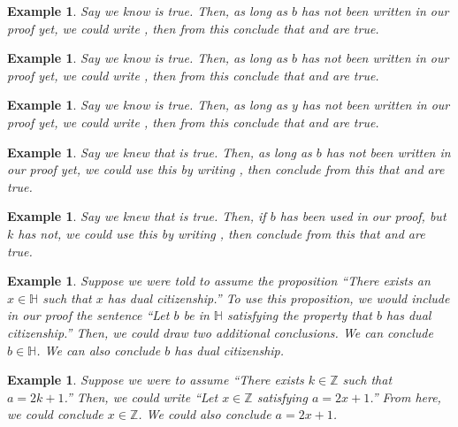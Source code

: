 \documentclass{book}
\newcounter{ekcounter}%
\theoremstyle{ekimcustom}
\newtheorem{example}[ekcounter]{Example}
\begin{document}
\begin{example}
Say we know  is true. Then, as long as $b$ has not been written in our proof yet, we could write , then from this conclude that  and  are true.
\end{example}
\begin{example}
Say we know  is true. Then, as long as $b$ has not been written in our proof yet, we could write , then from this conclude that  and  are true.
\end{example}
\begin{example}
Say we know  is true. Then, as long as $y$ has not been written in our proof yet, we could write , then from this conclude that  and  are true.
\end{example}
\begin{example}
Say we knew that  is true. Then, as long as $b$ has not been written in our proof yet, we could use this by writing , then conclude from this that  and  are true.
\end{example}
\begin{example}
Say we knew that  is true. Then, if $b$ has been used in our proof, but $k$ has not, we could use this by writing , then conclude from this that  and  are true.
\end{example}

\begin{example}
Suppose we were told to assume the proposition ``There exists an $x \in \mathbb{H}$ such that $x$ has dual citizenship.'' To use this proposition, we would include in our proof the sentence ``Let $b$ be in $\mathbb{H}$ satisfying the property that $b$ has dual citizenship.'' Then, we could draw two additional conclusions. We can conclude $b \in \mathbb{H}$. We can also conclude $b$ has dual citizenship.
\end{example}
\begin{example}\label{example:use-existence-revisit-first-proof}
Suppose we were to assume ``There exists $k \in \mathbb{Z}$ such that $a=2k+1$.'' Then, we could write ``Let $x \in \mathbb{Z}$ satisfying $a=2x+1$.'' 
From here, we could conclude $x \in \mathbb{Z}$. We could also conclude $a=2x+1$.
\end{example}
\end{document}
